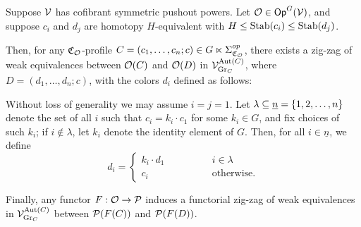 \documentclass[a4paper,10pt
,draft
]{article}%
\renewcommand{\1}{\eta}%
\begin{document}
\begin{lemma}
      \label{CAV_4.14_PROP2}
      Suppose $\V$ has cofibrant symmetric pushout powers.
      Let $\O \in \Op^G(\V)$, and suppose
      $c_i$ and $d_j$ are homotopy $H$-equivalent with $H \leq \Stab(c_i) \leq \Stab(d_j)$.

      Then, for any $\mathfrak C_\O$-profile $C = (c_1,\dots,c_n;c) \in G \ltimes \Sigma_{\mathfrak C_\O}^{op}$,
      there exists a zig-zag of weak equivalences between
      $\O(C)$ and $\O(D)$
      in $\V^{\Aut(C)}_{\mathrm{Gr}_C}$,
      where
      $D = (d_1,\ldots, d_n; c)$, with the colors $d_i$ defined as follows:
            
      Without loss of generality we may assume $i = j = 1$.
      Let $\lambda \subseteq \underline{n} = \set{1,2,\ldots, n}$ denote
      the set of all $i$ such that $c_i = k_i \cdot c_1$ for some $k_i\in G$,
      and fix choices of such $k_i$;
      if $i \notin \lambda$, let $k_i$ denote the identity element of $G$.
      Then, for all $i \in \underline{n}$, we define
      \begin{equation}
            \label{DCOLORS_EQ}
            d_i =
            \begin{cases}
                  k_i \cdot d_1 \qquad \qquad & i \in \lambda
                  \\
                  c_i & \mbox{otherwise.}
            \end{cases}
      \end{equation}
      
      Finally, any functor $F: \O \to \P$ induces a functorial zig-zag of weak equivalences in $\V^{\Aut(C)}_{\mathrm{Gr}_C}$
      between $\P(F(C))$ and $\P(F(D))$.
\end{lemma}
\end{document}
